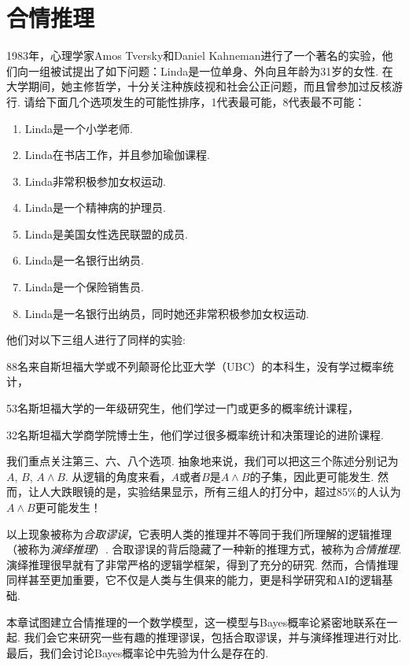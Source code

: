 \chapter{合情推理}\label{chap:plausible-reasoning}

1983年，心理学家Amos Tversky和Daniel Kahneman进行了一个著名的实验，他们向一组被试提出了如下问题：Linda是一位单身、外向且年龄为31岁的女性. 在大学期间，她主修哲学，十分关注种族歧视和社会公正问题，而且曾参加过反核游行. 请给下面几个选项发生的可能性排序，1代表最可能，8代表最不可能：
\begin{enumerate}
    \item Linda是一个小学老师.
    \item Linda在书店工作，并且参加瑜伽课程.
    \item Linda非常积极参加女权运动.
    \item Linda是一个精神病的护理员.
    \item Linda是美国女性选民联盟的成员.
    \item Linda是一名银行出纳员.
    \item Linda是一个保险销售员.
    \item Linda是一名银行出纳员，同时她还非常积极参加女权运动.
\end{enumerate}

他们对以下三组人进行了同样的实验:
\begin{enumerate*}[label=(\arabic*)]
    \item 88名来自斯坦福大学或不列颠哥伦比亚大学（UBC）的本科生，没有学过概率统计，
    \item 53名斯坦福大学的一年级研究生，他们学过一门或更多的概率统计课程，
    \item 32名斯坦福大学商学院博士生，他们学过很多概率统计和决策理论的进阶课程.
\end{enumerate*}

我们重点关注第三、六、八个选项. 抽象地来说，我们可以把这三个陈述分别记为$A$, $B$, $A\wedge B$. 从逻辑的角度来看，$A$或者$B$是$A\wedge B$的子集，因此更可能发生. 然而，让人大跌眼镜的是，实验结果显示，所有三组人的打分中，超过85\%的人认为$A\wedge B$更可能发生！

以上现象被称为\emph{合取谬误}，它表明人类的推理并不等同于我们所理解的逻辑推理（被称为\emph{演绎推理}）. 合取谬误的背后隐藏了一种新的推理方式，被称为\emph{合情推理}. 演绎推理很早就有了非常严格的逻辑学框架，得到了充分的研究. 然而，合情推理同样甚至更加重要，它不仅是人类与生俱来的能力，更是科学研究和AI的逻辑基础. 

本章试图建立合情推理的一个数学模型，这一模型与Bayes概率论紧密地联系在一起. 我们会它来研究一些有趣的推理谬误，包括合取谬误，并与演绎推理进行对比. 最后，我们会讨论Bayes概率论中先验为什么是存在的.

